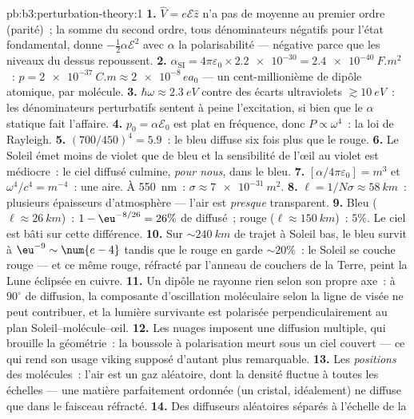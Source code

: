 \begin{solution}{pb:b3:perturbation-theory:1}
\textbf{1.} $\hat V = e\mathcal E\hat z$ n'a pas de moyenne au premier
ordre (parité)~; la somme du second ordre, tous dénominateurs négatifs
pour l'état fondamental, donne $-\tfrac12\alpha\mathcal E^2$ avec
$\alpha$ la polarisabilité --- négative parce que les niveaux du
dessus repoussent.
\textbf{2.} $\alpha_{\text{SI}} = 4\pi\varepsilon_0 \times
\num{2.2e-30} = \qty{2.4e-40}{F.m^2}$~: $p = \qty{2e-37}{C.m}
\approx \num{2e-8}\,ea_0$ --- un cent-millionième de dipôle atomique,
par molécule.
\textbf{3.} $\hbar\omega \approx \qty{2.3}{eV}$ contre des écarts
ultraviolets $\gtrsim\qty{10}{eV}$~: les dénominateurs perturbatifs
sentent à peine l'excitation, si bien que le $\alpha$ statique fait
l'affaire.
\textbf{4.} $p_0 = \alpha\mathcal E_0$ est plat en fréquence, donc $P
\propto \omega^4$~: la loi de Rayleigh.
\textbf{5.} $(700/450)^4 = 5.9$~: le bleu diffuse six fois plus que le
rouge.
\textbf{6.} Le Soleil émet moins de violet que de bleu et la
sensibilité de l'œil au violet est médiocre~: le ciel diffusé culmine,
\emph{pour nous}, dans le bleu.
\textbf{7.} $[\alpha/4\pi\varepsilon_0] = \unit{m^3}$ et
$\omega^4/c^4 = \unit{m^{-4}}$~: une aire. À \qty{550}{nm}~:
$\sigma \approx \qty{7e-31}{m^2}$.
\textbf{8.} $\ell = 1/N\sigma \approx \qty{58}{km}$~: plusieurs
épaisseurs d'atmosphère --- l'air est \emph{presque} transparent.
\textbf{9.} Bleu ($\ell \approx \qty{26}{km}$)~: $1 -
\eu^{-8/26} = 26\%$ de diffusé~; rouge ($\ell \approx \qty{150}{km}$)~:
$5\%$. Le ciel est bâti sur cette différence.
\textbf{10.} Sur $\sim\qty{240}{km}$ de trajet à Soleil bas, le bleu
survit à $\eu^{-9} \sim \num{e-4}$ tandis que le rouge en garde
$\sim20\%$~: le Soleil se couche rouge --- et ce même rouge, réfracté
par l'anneau de couchers de la Terre, peint la Lune éclipsée en cuivre.
\textbf{11.} Un dipôle ne rayonne rien selon son propre axe~: à
$90^\circ$ de diffusion, la composante d'oscillation moléculaire selon
la ligne de visée ne peut contribuer, et la lumière survivante est
polarisée perpendiculairement au plan Soleil--molécule--œil.
\textbf{12.} Les nuages imposent une diffusion multiple, qui brouille
la géométrie~: la boussole à polarisation meurt sous un ciel couvert
--- ce qui rend son usage viking supposé d'autant plus remarquable.
\textbf{13.} Les \emph{positions} des molécules~: l'air est un gaz
aléatoire, dont la densité fluctue à toutes les échelles --- une
matière parfaitement ordonnée (un cristal, idéalement) ne diffuse que
dans le faisceau réfracté.
\textbf{14.} Des diffuseurs aléatoires séparés à l'échelle de la

\end{solution}
